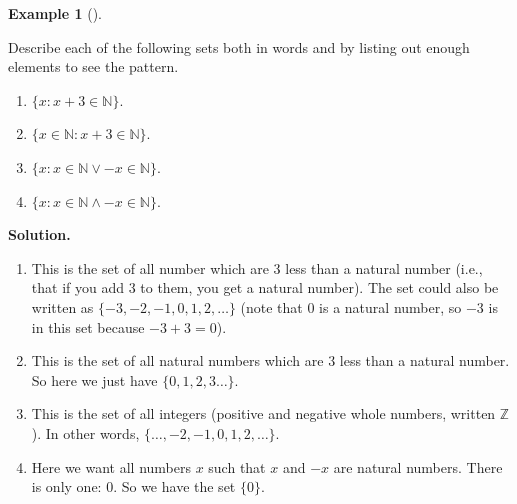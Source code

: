 \documentclass[10pt,]{book}
\theoremstyle{plain}
\theoremstyle{definition}
\newtheorem{example}[theorem]{Example}
\theoremstyle{definition}
\theoremstyle{definition}
\numberwithin{equation}{section}
\def\N{\mathbb N}
\def\Z{\mathbb Z}
\def\st{:}
\begin{document}
\begin{example}[]\label{example-1}

          Describe each of the following sets both in words and by listing out enough elements to see the pattern.
\leavevmode%
\begin{enumerate}
\item\hypertarget{li-8}{}\(\{x \st x + 3 \in \N\}\).\item\hypertarget{li-9}{}\(\{x \in \N \st x + 3 \in \N\}\).\item\hypertarget{li-10}{}\(\{x \st x \in \N \vee -x \in \N\}\).\item\hypertarget{li-11}{}\(\{x \st x \in \N \wedge -x \in \N\}\).\end{enumerate}
\par\medskip\noindent%
\textbf{Solution.}\quad \leavevmode%
\begin{enumerate}
\item\hypertarget{li-12}{}
              This is the set of all number which are 3 less than a natural number (i.e., that if you add 3 to them, you get a natural number). The set could also be written as \(\{-3, -2, -1, 0, 1, 2, \ldots\}\) (note that 0 is a natural number, so
              \(-3\) is in this set because \(-3 + 3 = 0\)).
\item\hypertarget{li-13}{}
              This is the set of all natural numbers which are 3 less than a natural number. So here we just have \(\{0, 1, 2,3 \ldots\}\).
\item\hypertarget{li-14}{}
              This is the set of all integers
               (positive and negative whole numbers, written \(\Z\)). In other words, \(\{\ldots, -2, -1, 0, 1, 2, \ldots\}\).
\item\hypertarget{li-15}{}
              Here we want all numbers \(x\) such that \(x\) and \(-x\) are natural numbers. There is only one: 0. So we have the set \(\{0\}\).
\end{enumerate}
\end{example}
\par
\end{document}
